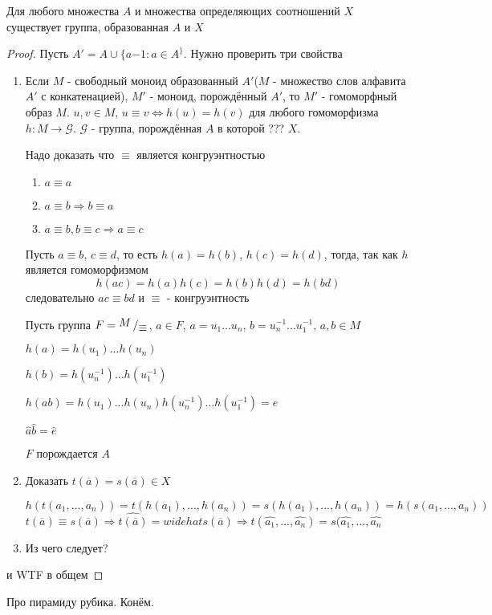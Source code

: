 \documentclass[../main/document.tex]{subfiles}
\begin{document}
\begin{thm}
Для любого множества $A$ и множества определяющих соотношений $X$ существует группа, образованная $A$ и $X$
\begin{proof}
Пусть $A'=A\cup\{a{-1}:a\in A^\}$. Нужно проверить три свойства
\begin{enumerate}
\item Если $M$ - свободный моноид образованный $A'$($M$ - множество слов алфавита $A'$ с конкатенацией), $M'$ - моноид, порождённый $A'$, то $M'$ - гомоморфный образ $M$. $u,v\in M$, $u\equiv v\Leftrightarrow h(u)=h(v)$ для любого гомоморфизма $h:M\rightarrow \mathcal{G}$. $\mathcal{G}$ - группа, порождённая $A$ в которой ??? $X$.

Надо доказать что $\equiv$ является конгруэнтностью
\begin{enumerate}
\item $a\equiv a$
\item $a\equiv b\Rightarrow b\equiv a$
\item $a\equiv b, b\equiv c\Rightarrow a\equiv c$
\end{enumerate}
Пусть $a\equiv b$, $c\equiv d$, то есть $h(a)=h(b)$, $h(c)=h(d)$, тогда, так как $h$  является гомоморфизмом
$$h(ac)=h(a)h(c)=h(b)h(d)=h(bd)$$
следовательно $ac\equiv bd$ и $\equiv$ - конгруэнтность

Пусть группа $F=\bigslant{M}{\equiv}$, $\widehat{a}\in F$, $a=u_1...u_n$, $b=u_n^{-1}...u_1^{-1}$, $a,b\in M$

$h(a)=h(u_1)...h(u_n)$

$h(b)=h(u_n^{-1})...h(u_1^{-1})$

$h(ab)=h(u_1)...h(u_n)h(u_n^{-1})...h(u_1^{-1})=e$

$\widehat{a}\widehat{b}=\widehat{e}$

$F$ порождается $A$
\item Доказать $t(\overline{a})=s(\overline{a})\in X$

$h(t(a_1,...,a_n))=t(h(a_1),...,h(a_n))=s(h(a_1),...,h(a_n))=h(s(a_1,...,a_n))$
$t(\overline{a})\equiv s(\overline{a})\Rightarrow \widehat{t(\overline{a})}=widehat{s(\overline{a})}\Rightarrow t(\widehat{a_1},...,\widehat{a_n})=s(\widehat{a_1},...,\widehat{a_n}$
\item Из чего следует?
\end{enumerate}
и WTF в общем
\end{proof}
\end{thm}

\begin{exm}
Про пирамиду рубика. Конём.
\end{exm}
\end{document}
